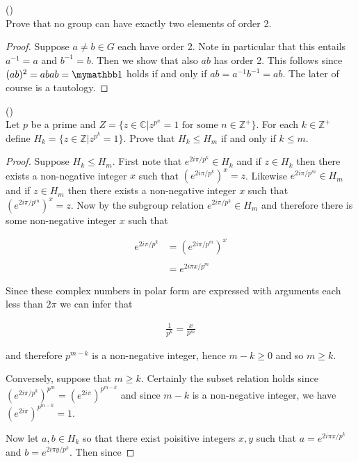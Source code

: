 \documentclass{exam}
\begin{document}
\begin{questions}
\vspace{1cm}

\question()\\
Prove that no group can have exactly two elements of order 2.

\begin{proof}
  Suppose $a\ne b\in G$ each have order 2.  Note in particular that this entails $a^{-1}=a$ and $b^{-1}=b$.  Then we show that also $ab$ has order 2.  This follows since $(ab)^2 = abab = \mymathbb 1$ holds if and only if $ab = a^{-1}b^{-1}=ab$.  The later of course is a tautology.
\end{proof}

\vspace{1cm}

\question()\\
Let $p$ be a prime and $Z=\{z\in\mathbb C|z^{p^n}=1 \text{ for some } n\in\mathbb Z^+\}$.  For each $k\in\mathbb Z^+$ define $H_k=\{z\in\mathbb Z|z^{p^k}=1\}$.  Prove that $H_k\leq H_m$ if and only if $k\leq m$.

\begin{proof}
  Suppose $H_k\leq H_m$.  First note that $e^{2i\pi/p^k}\in H_k$ and if $z\in H_k$ then there exists a non-negative integer $x$ such that $(e^{2i\pi/p^k})^x=z$. Likewise $e^{2i\pi/p^m}\in H_m$ and if $z\in H_m$ then there exists a non-negative integer $x$ such that $(e^{2i\pi/p^m})^x=z$.  Now by the subgroup relation $e^{2i\pi/p^k}\in H_m$ and therefore there is some non-negative integer $x$ such that

  \begin{align*}
    e^{2i\pi/p^k} &= (e^{2i\pi/p^m})^x \\\\
    &= e^{2i\pi x/p^m}
  \end{align*}

  Since these complex numbers in polar form are expressed with arguments each less than $2\pi$ we can infer that

  \begin{align*}
    \frac{1}{p^k} = \frac{x}{p^m}
  \end{align*}

  and therefore $p^{m-k}$ is a non-negative integer, hence $m-k\geq 0$ and so $m\geq k$.

  Conversely, suppose that $m\geq k$.  Certainly the subset relation holds since $(e^{2i\pi/p^k})^{p^m}=(e^{2i\pi})^{p^{m-k}}$ and since $m-k$ is a non-negative integer, we have $(e^{2i\pi})^{p^{m-k}}=1$.

  Now let $a,b\in H_k$ so that there exist poisitive integers $x,y$ such that $a=e^{2i\pi x/p^k}$ and $b=e^{2i\pi y/p^k}$.  Then since


\end{proof}
\end{questions}
\end{document}
